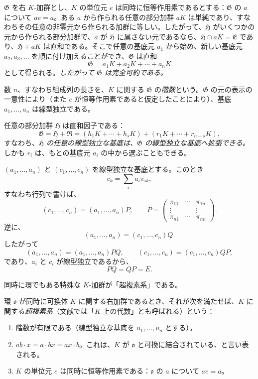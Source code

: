 \documentclass[11pt]{article}
\providecommand{\mG}{\mathfrak{G}}
\providecommand{\mE}{\mathfrak{E}}
\providecommand{\mH}{\mathfrak{H}}
\providecommand{\mR}{\mathfrak{R}}
\providecommand{\mo}{\mathfrak{o}}
\begin{document}
$\mG$ を右 $K$-加群とし、$K$ の単位元 $e$ は同時に恒等作用素であるとする：$\mG$ の $a$ について $ae=a$。ある $a$ から作られる任意の部分加群 $aK$ は単純であり、すなわちその任意の非零元から作られる加群に等しい。したがって、$\mH$ がいくつかの元から作られる部分加群で、$a$ が $\mH$ に属さない元であるなら、$\mH\cap aK=\mE$ であり、$\mH+aK$ は直和である。そこで任意の基底元 $a_1$ から始め、新しい基底元 $a_2,a_3,\ldots$ を順に付け加えることができ、$\mG$ は直和
\[
        \mG=a_1K+a_2K+\cdots+a_nK
\]
として得られる。\emph{したがって $\mG$ は完全可約である。}

数 $n$、すなわち組成列の長さを、$K$ に関する $\mG$ の\emph{階数}という。$\mG$ の元の表示の一意性により（また $e$ が恒等作用素であると仮定したことにより）、基底 $a_1,\ldots,a_n$ は線型独立である。

任意の部分加群 $\mH$ は直和因子である：
\[
        \mG=\mH+\mR=(h_1K+\cdots+h_sK)+(r_1K+\cdots+r_{n-s}K),
\]
すなわち、\emph{$\mH$ の任意の線型独立な基底は、$\mG$ の線型独立な基底へ拡張できる。} しかも $r_i$ は、もとの基底元 $a_i$ の中から選ぶこともできる。

$(a_1,\ldots,a_n)$ と $(c_1,\ldots,c_n)$ を線型独立な基底とする。このとき
\[
        c_k=\sum_i a_i\pi_{ik},
\]
すなわち行列で書けば、
\[
        (c_1,\ldots,c_n)=(a_1,\ldots,a_n)P,
        \qquad
        P=\begin{pmatrix}
        \pi_{11}&\cdots&\pi_{1n}\\
        \vdots&&\vdots\\
        \pi_{n1}&\cdots&\pi_{nn}
        \end{pmatrix}.
\]
逆に、
\[
        (a_1,\ldots,a_n)=(c_1,\ldots,c_n)Q.
\]
したがって
\[
        (a_1,\ldots,a_n)=(a_1,\ldots,a_n)PQ,
        \qquad
        (c_1,\ldots,c_n)=(c_1,\ldots,c_n)QP,
\]
であり、$a_i$ と $c_i$ が線型独立であるから、
\[
        PQ=QP=E.
\]

同時に環でもある特殊な $K$-加群が「超複素系」である。

環 $\mo$ が同時に可換体 $K$ に関する右加群であるとき、それが次を満たせば、$K$ に関する\emph{超複素系}（文献では「$K$ 上の代数」とも呼ばれる）という：
\begin{enumerate}
\item 階数が有限である（線型独立な基底を $u_1,\ldots,u_n$ とする）。
\item $ab\cdot x=a\cdot bx=ax\cdot b$。これは、$K$ が $\mo$ と可換に結合されている、と言い表される。
\item $K$ の単位元 $e$ は同時に恒等作用素である：$\mo$ の $a$ について $ae=a$。
\end{enumerate}
\end{document}
